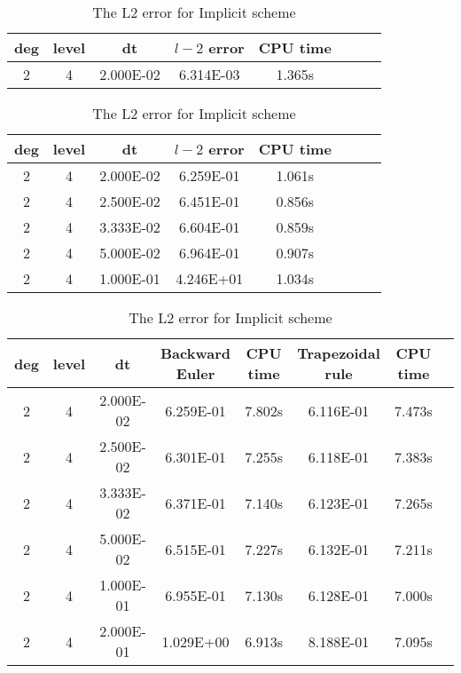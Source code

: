 \documentclass[a4paper]{article}
\begin{document}
\begin{table}[htbp]
\caption{\label{tab:test}3D: The L2 error for Explicit 3rd Runge Kutta with time period=0.5}
\centering
\vspace{5pt}
\begin{tabular}{cccccccc}
\toprule
deg & level&dt&$l-2$ error &CPU time \\
\midrule
2&4&2.000E-02&6.314E-03&1.365s\\
\bottomrule
\end{tabular}
\caption{\label{tab:test}The L2 error for Semi-Implicit Backward Euler}
\centering
\vspace{5pt}

\begin{tabular}{cccccccc}
\toprule
deg & level&dt&$l-2$ error &CPU time \\
\midrule
2&4&2.000E-02&6.259E-01&1.061s\\
2&4&2.500E-02&6.451E-01&0.856s\\
2&4&3.333E-02&6.604E-01&0.859s\\
2&4&5.000E-02&6.964E-01&0.907s\\
2&4&1.000E-01&4.246E+01&1.034s\\
\bottomrule
\end{tabular}


\caption{\label{tab:test}The L2 error for Implicit scheme}
\centering
\vspace{5pt}

\begin{tabular}{cccccccc}
\toprule
deg & level&dt&Backward Euler &CPU time &Trapezoidal rule&CPU time\\
\midrule
2&4&2.000E-02&6.259E-01&7.802s&6.116E-01&7.473s\\
2&4&2.500E-02&6.301E-01&7.255s&6.118E-01&7.383s\\
2&4&3.333E-02&6.371E-01&7.140s&6.123E-01&7.265s\\
2&4&5.000E-02&6.515E-01&7.227s&6.132E-01&7.211s\\
2&4&1.000E-01&6.955E-01&7.130s&6.128E-01&7.000s\\
2&4&2.000E-01&1.029E+00&6.913s&8.188E-01&7.095s\\
\bottomrule
\end{tabular}


\end{table}
\end{document}
